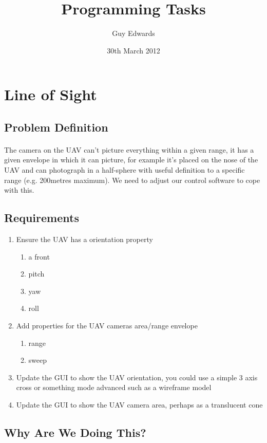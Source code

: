 \documentclass[11pt]{book}
\title{\textbf{Programming Tasks}}
\author{Guy Edwards}
\date{30th March 2012}
\begin{document}
\section{Line of Sight}

\subsection{Problem Definition}

\paragraph{} The camera on the UAV can't picture everything within a given range, it has a given envelope in which it can picture, for example it's placed on the nose of the UAV and can photograph in a half-sphere with useful definition to a specific range (e.g. 200metres maximum). We need to adjust our control software to cope with this.

\subsection{Requirements}

\begin{enumerate}
\item Ensure the UAV has a orientation property
     \begin{enumerate}
         \item a front
         \item pitch
         \item yaw
         \item roll
     \end{enumerate}
\item Add properties for the UAV cameras area/range envelope
     \begin{enumerate}
         \item range
         \item sweep
     \end{enumerate}
\item Update the GUI to show the UAV orientation, you could use a simple 3 axis cross or something mode advanced such as a wireframe model
\item Update the GUI to show the UAV camera area, perhaps as a translucent cone
\end{enumerate}

\subsection{Why Are We Doing This?}
\end{document}
